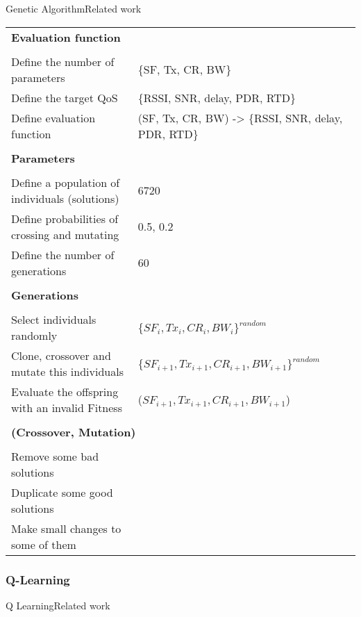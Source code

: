 \begin{frame}{Genetic Algorithm}{Related work}
		\begin{tabular}{ll}
			\multicolumn{2}{l}{\textbf{Evaluation function}} \\\\
			Define the number of parameters                       	& \{SF, Tx, CR, BW\} \\
			Define the target QoS			                      	& \{RSSI, SNR, delay, PDR, RTD\} \\
			Define evaluation function                            	& \red{Score}(SF, Tx, CR, BW) -> \{RSSI, SNR, delay, PDR, RTD\} \\\\
			\multicolumn{2}{l}{\textbf{Parameters}} \\\\
			Define a population of individuals (solutions)      	& 6720  \\
			Define probabilities of crossing and mutating       	& 0.5, 0.2 \\ 
			Define the number of generations                   	 	& 60 \\\\
			\multicolumn{2}{l}{\textbf{Generations}} \\\\
			Select individuals randomly    							& \{$SF_{i}, Tx_{i}, CR_{i}, BW_{i}\}^{random}$ 	\\
			Clone, crossover and mutate this individuals 	        & \{$SF_{i+1}, Tx_{i+1}, CR_{i+1}, BW_{i+1}\}^{random}$ \\
			Evaluate the offspring with an invalid Fitness 			& \red{Score}($SF_{i+1}, Tx_{i+1}, CR_{i+1}, BW_{i+1}$) \\\\
			\multicolumn{2}{l}{\textbf{(Crossover, Mutation)}} \\\\
			Remove some bad solutions                                & \\
			Duplicate some good solutions                            & \\
			Make small changes to some of them                       & \\
		\end{tabular}
\end{frame}


\subsubsection{Q-Learning}
\begin{frame}{Q Learning}{Related work}
\end{frame}


